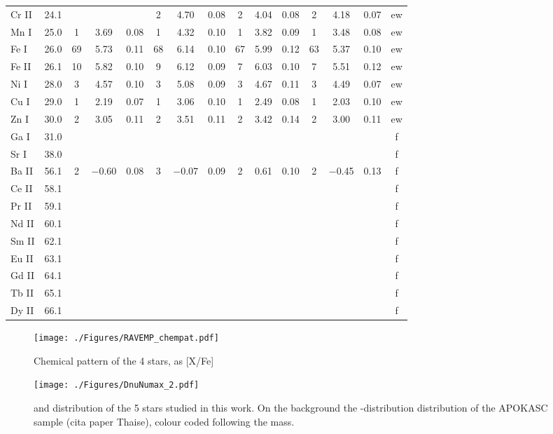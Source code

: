 \documentclass{aa}
\begin{document}
\begin{table}
\begin{tabular}{ll|ccc|ccc|ccc|ccc|c}
Cr II&24.1    &      &        &       & 2 & 4.70 & 0.08 & 2 & 4.04 & 0.08 & 2 & 4.18 & 0.07 & ew \\ 
Mn I &25.0    &  1   & 3.69   & 0.08  & 1 & 4.32 & 0.10 & 1 & 3.82 & 0.09 & 1 & 3.48 & 0.08 & ew \\ 
Fe I &26.0    & 69   & 5.73   & 0.11  & 68& 6.14 & 0.10 & 67& 5.99 & 0.12 & 63& 5.37 & 0.10 & ew  \\
Fe II&26.1    & 10   & 5.82   & 0.10  & 9 & 6.12 & 0.09 & 7 & 6.03 & 0.10 & 7 & 5.51 & 0.12 & ew \\
Ni I &28.0    & 3    & 4.57   & 0.10  & 3 & 5.08 & 0.09 & 3 & 4.67 & 0.11 & 3 & 4.49 & 0.07 & ew \\  
Cu I &29.0    & 1    & 2.19   & 0.07  & 1 & 3.06 & 0.10 & 1 & 2.49 & 0.08 & 1 & 2.03 & 0.10 & ew \\                           
Zn I &30.0    & 2    & 3.05   & 0.11  & 2 & 3.51 & 0.11 & 2 & 3.42 & 0.14 & 2 & 3.00 & 0.11 & ew \\  
Ga I &31.0    &     &   &   & & & & & & & & & & f \\                        
Sr I &38.0    &     &   &   & & & & & & & & & & f \\                            
Ba II&56.1    &  2   & $-$0.60& 0.08  &3 & $-$0.07 & 0.09& 2 & 0.61& 0.10 & 2 & $-$0.45& 0.13 & f \\ 
Ce II&58.1    &     &   &   & & & & & & & & & & f \\ 
Pr II&59.1    &     &   &   & & & & & & & & & & f \\ 
Nd II&60.1    &     &   &   & & & & & & & & & & f \\ 
Sm II&62.1    &     &   &   & & & & & & & & & & f \\  
Eu II&63.1    &     &   &   & & & & & & & & & & f \\
Gd II&64.1    &     &   &   & & & & & & & & & & f \\
Tb II&65.1    &     &   &   & & & & & & & & & & f \\                            
Dy II&66.1    &     &   &   & & & & & & & & & & f \\ \hline
\end{tabular}
\end{table}

   \begin{figure}
   \centering
   \texttt{[image: ./Figures/RAVEMP\_chempat.pdf]}
   \caption{Chemical pattern of the 4 stars, as [X/Fe] }
              \label{Fig:abdpattern}%
    \end{figure}
   \begin{figure}
   \centering
   \texttt{[image: ./Figures/DnuNumax\_2.pdf]}
   \caption{\Dnu and \numax distribution of the 5 stars studied in this work. On the background the \dnu-\numax distribution distribution of the APOKASC sample (cita paper Thaise), colour coded following the mass.}
              \label{Fig:dataseismo}%
    \end{figure}
\end{document}

